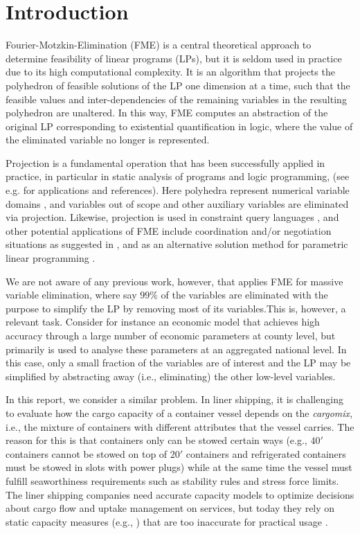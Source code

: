 \section{Introduction}

Fourier-Motzkin-Elimination (FME) is a central theoretical approach to determine feasibility of linear programs (LPs), but it is seldom used in practice due to its high computational complexity.
%
It is an algorithm that projects the polyhedron of feasible solutions of the LP one dimension at a time, such that the feasible values and inter-dependencies of the remaining variables in the resulting polyhedron are unaltered. In this way, FME computes an abstraction of the original LP corresponding to existential quantification in logic, {where the value of the eliminated variable no longer is represented.}

Projection is a fundamental operation that has been successfully applied in practice, in particular in static analysis of programs and logic programming,
(see e.g. \cite{benoy05} for applications and references). Here polyhedra represent 
numerical variable domains \cite{cousot78}, and variables out of scope and other auxiliary variables are eliminated via projection. Likewise, projection is used in constraint query languages \cite{lassez90}, and other potential applications of FME include coordination and/or negotiation situations as suggested in \cite{lukatskii08}, and as an alternative solution method for parametric linear programming \cite{jones08}.

We are not aware of any previous work, however, that applies FME for massive variable elimination, where say $99\%$ of the variables are eliminated with the purpose to simplify the LP by removing most of its variables.This is, however, a relevant task. Consider for instance an economic model that achieves high accuracy through a large number of economic parameters at county level, but primarily is used to analyse these parameters at an aggregated national level. In this case, only a small fraction of the variables are of interest and the LP may be simplified by abstracting away (i.e., eliminating) the other low-level variables.

In this report, we consider a similar problem. In liner shipping, it is challenging to evaluate how the cargo capacity of a container vessel depends on the {\em cargomix}, i.e., the mixture of containers with different attributes that the vessel carries. The reason for this is that containers only can be stowed certain ways (e.g., $40'$ containers cannot be stowed on top of $20'$ containers and refrigerated containers must be stowed in slots with power plugs) while at the same time the vessel must fulfill seaworthiness requirements such as stability rules and stress force limits. The liner shipping companies need accurate capacity models to optimize decisions about cargo flow and uptake management on services, but today they rely on static capacity measures (e.g., \cite{ting04,feng08,zurheide13}) that are too inaccurate for practical usage \cite{AlbertosThesis}.

